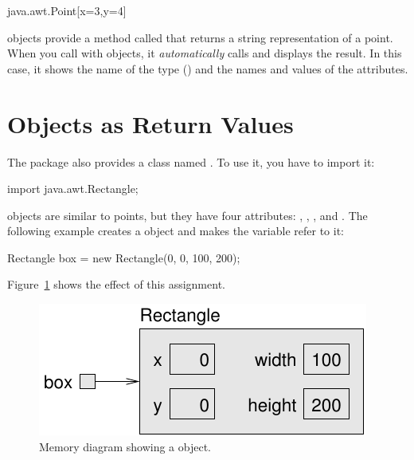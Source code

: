 \begin{stdout}
java.awt.Point[x=3,y=4]
\end{stdout}


 objects provide a method called  that returns a string representation of a point.
When you call  with objects, it {\em automatically} calls  and displays the result.
In this case, it shows the name of the type () and the names and values of the attributes.


\section{Objects as Return Values}


The  package also provides a class named .
To use it, you have to import it:

\begin{code}
import java.awt.Rectangle;
\end{code}

 objects are similar to points, but they have four attributes: , , , and .
The following example creates a  object and makes the variable  refer to it:

\begin{code}
Rectangle box = new Rectangle(0, 0, 100, 200);
\end{code}

Figure~\ref{fig.rectangle} shows the effect of this assignment.

\begin{figure}[!ht]
\begin{center}
\includegraphics{figs/rectangle.pdf}
\caption{Memory diagram showing a  object.}
\label{fig.rectangle}
\end{center}
\end{figure}

